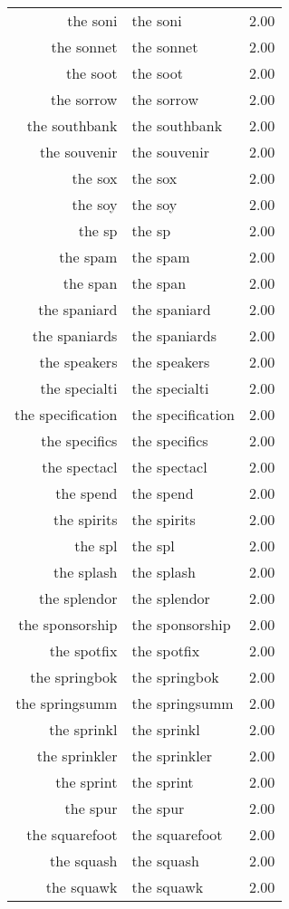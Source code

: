 \begin{table}[ht]
\begin{tabular}{rlr}
  the soni & the soni & 2.00 \\ 
  the sonnet & the sonnet & 2.00 \\ 
  the soot & the soot & 2.00 \\ 
  the sorrow & the sorrow & 2.00 \\ 
  the southbank & the southbank & 2.00 \\ 
  the souvenir & the souvenir & 2.00 \\ 
  the sox & the sox & 2.00 \\ 
  the soy & the soy & 2.00 \\ 
  the sp & the sp & 2.00 \\ 
  the spam & the spam & 2.00 \\ 
  the span & the span & 2.00 \\ 
  the spaniard & the spaniard & 2.00 \\ 
  the spaniards & the spaniards & 2.00 \\ 
  the speakers & the speakers & 2.00 \\ 
  the specialti & the specialti & 2.00 \\ 
  the specification & the specification & 2.00 \\ 
  the specifics & the specifics & 2.00 \\ 
  the spectacl & the spectacl & 2.00 \\ 
  the spend & the spend & 2.00 \\ 
  the spirits & the spirits & 2.00 \\ 
  the spl & the spl & 2.00 \\ 
  the splash & the splash & 2.00 \\ 
  the splendor & the splendor & 2.00 \\ 
  the sponsorship & the sponsorship & 2.00 \\ 
  the spotfix & the spotfix & 2.00 \\ 
  the springbok & the springbok & 2.00 \\ 
  the springsumm & the springsumm & 2.00 \\ 
  the sprinkl & the sprinkl & 2.00 \\ 
  the sprinkler & the sprinkler & 2.00 \\ 
  the sprint & the sprint & 2.00 \\ 
  the spur & the spur & 2.00 \\ 
  the squarefoot & the squarefoot & 2.00 \\ 
  the squash & the squash & 2.00 \\ 
  the squawk & the squawk & 2.00 \\ 

\end{tabular}
\end{table}
